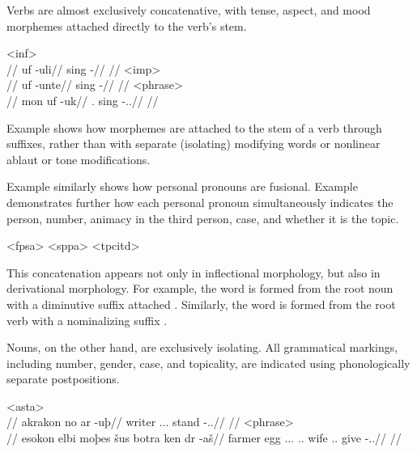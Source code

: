 Verbs are almost exclusively concatenative, with tense, aspect, and mood morphemes attached directly to the verb's stem.

	\a<inf>\begingl
		\glpreamble{}\\
		//
		\gla uf -uli//
		\glb sing -\Inf//
		\glft {}//
	\endgl
	\a<imp>\begingl
		\glpreamble{}\\
		//
		\gla uf -unte//
		\glb sing -\Imp//
		\glft {}//
	\endgl
	\a<phrase>\begingl
		\glpreamble{}\\
		//
		\gla mon uf -uk//
		\glb \Fps.\Top{} sing -\Ind.\Pst.\Prf//
	\glft {}//
	\endgl
\xe

Example  shows how morphemes are attached to the stem of a verb through suffixes, rather than with separate (isolating) modifying words or nonlinear ablaut or tone modifications.

Example  similarly shows how personal pronouns are fusional. Example  demonstrates further how each personal pronoun simultaneously indicates the person, number, animacy in the third person, case, and whether it is the topic.

	\a<fpsa>    
	\a<sppa>    
	\a<tpcitd>    
\xe

This concatenation appears not only in inflectional morphology, but also in derivational morphology. For example, the word    is formed from the root noun    with a diminutive suffix attached . Similarly, the word    is formed from the root verb    with a nominalizing suffix .

Nouns, on the other hand, are exclusively isolating. All grammatical markings, including number, gender, case, and topicality, are indicated using phonologically separate postpositions.

	\a<asta>\begingl
		\glpreamble{}\\
		//
		\gla akrakon no ar -uþ//
		\glb writer \An.\Sg.\Top.\Abs{} stand -\Ind.\Npst.\Prg//
		\glft {}//
	\endgl
	\a<phrase>\begingl
		\glpreamble{}\\
		//
		\gla esokon elbi moþes šus botra ken dr -aš//
		\glb farmer egg \In.\Pc.\Top.\Acc{} \Tps.\An.\Gen{} wife \An.\Pl.\Dat{} give -\Ind.\Npst.\Rtsp//
		\glft {}//
	\endgl
\xe

